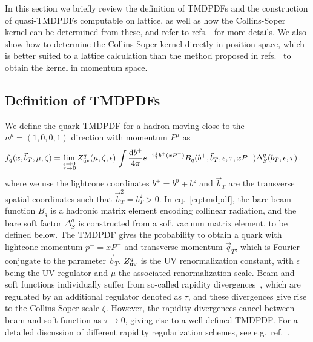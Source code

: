 \documentclass[11pt,a4paper]{article}
\DeclareRobustCommand{\eq}[1]{eq.~\eqref{eq:#1}}
\DeclareRobustCommand{\mycite}[1]{ref.~\cite{#1}}
\DeclareRobustCommand{\mycites}[1]{refs.~\cite{#1}}
\newcommand{\df}{\mathrm{d}}
\newcommand{\img}{\mathrm{i}}
\newcommand{\eps}{\epsilon}
\newcommand{\bt}{\vec b_T}
\newcommand{\qt}{\vec q_T}
\begin{document}
In this section we briefly review the definition of TMDPDFs and the construction of quasi-TMDPDFs computable on lattice,
as well as how the Collins-Soper kernel can be determined from these, and refer to \mycites{Ebert:2018gzl,Ebert:2019okf} for more details.
We also show how to determine the Collins-Soper kernel directly in position space, which is better suited to a lattice calculation than the method proposed in \mycites{Ebert:2018gzl} to obtain the kernel in momentum space.

\subsection{Definition of TMDPDFs}
\label{sec:def_TMDPDF}

We define the quark TMDPDF for a hadron moving close to the $n^\mu = (1,0,0,1)$ direction with momentum $P^\mu$ as
\begin{align} \label{eq:tmdpdf}
 f_q(x, \bt, \mu , \zeta) &
 = \lim_{\substack{\eps\to 0 \\ \tau\to 0}} Z_{\rm uv}^q(\mu,\zeta,\eps)\,
   \int\frac{\df b^+}{4\pi} e^{-\img \frac12 b^+ (x P^-)}
   B_q(b^+, \bt, \eps, \tau, x P^-) \Delta_S^q(b_T,\eps,\tau)
\,,\end{align}
where we use the lightcone coordinates $b^\pm = b^0 \mp b^z$ and $\bt$ are the transverse spatial coordinates
such that $\bt^2 = b_T^2 > 0$.
In \eq{tmdpdf}, the bare beam function $B_q$ is a hadronic matrix element encoding collinear radiation,
and the bare soft factor $\Delta_S^q$ is constructed from a soft vacuum matrix element, to be defined below.
The TMDPDF gives the probability to obtain a quark with lightcone momentum $p^- = x P^-$ and transverse momentum $\qt$,
which is Fourier-conjugate to the parameter $\bt$.
$Z_{\rm uv}^q$ is the UV renormalization constant, with $\eps$ being the UV regulator and $\mu$ the associated renormalization scale.
Beam and soft functions individually suffer from so-called rapidity divergences~\cite{Soper:1979fq,Collins:1981uk,Collins:1992tv,Collins:2008ht,Becher:2010tm,GarciaEchevarria:2011rb,Chiu:2011qc,Chiu:2012ir}, which are regulated by an additional regulator denoted as $\tau$, and these divergences give rise to the Collins-Soper scale $\zeta$.
However, the rapidity divergences cancel between beam and soft function as $\tau\to0$, giving rise to a well-defined TMDPDF.
For a detailed discussion of different rapidity regularization schemes, see e.g.~\mycite{Ebert:2019okf}.
\end{document}
